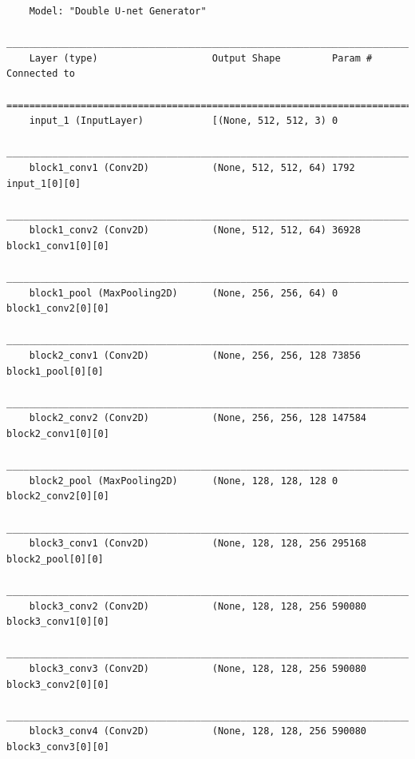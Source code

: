                {\scriptsize
                \begin{verbatim}
    Model: "Double U-net Generator"
    __________________________________________________________________________________________________
    Layer (type)                    Output Shape         Param #     Connected to                     
    ==================================================================================================
    input_1 (InputLayer)            [(None, 512, 512, 3) 0                                            
    __________________________________________________________________________________________________
    block1_conv1 (Conv2D)           (None, 512, 512, 64) 1792        input_1[0][0]                    
    __________________________________________________________________________________________________
    block1_conv2 (Conv2D)           (None, 512, 512, 64) 36928       block1_conv1[0][0]               
    __________________________________________________________________________________________________
    block1_pool (MaxPooling2D)      (None, 256, 256, 64) 0           block1_conv2[0][0]               
    __________________________________________________________________________________________________
    block2_conv1 (Conv2D)           (None, 256, 256, 128 73856       block1_pool[0][0]                
    __________________________________________________________________________________________________
    block2_conv2 (Conv2D)           (None, 256, 256, 128 147584      block2_conv1[0][0]               
    __________________________________________________________________________________________________
    block2_pool (MaxPooling2D)      (None, 128, 128, 128 0           block2_conv2[0][0]               
    __________________________________________________________________________________________________
    block3_conv1 (Conv2D)           (None, 128, 128, 256 295168      block2_pool[0][0]                
    __________________________________________________________________________________________________
    block3_conv2 (Conv2D)           (None, 128, 128, 256 590080      block3_conv1[0][0]               
    __________________________________________________________________________________________________
    block3_conv3 (Conv2D)           (None, 128, 128, 256 590080      block3_conv2[0][0]               
    __________________________________________________________________________________________________
    block3_conv4 (Conv2D)           (None, 128, 128, 256 590080      block3_conv3[0][0]               

\end{verbatim}}
